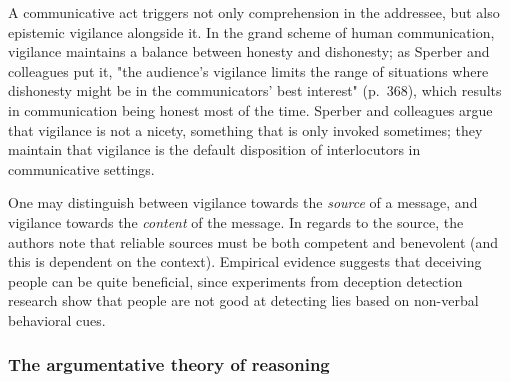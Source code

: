 A communicative act triggers not only comprehension in the addressee, but also epistemic vigilance alongside it.
In the grand scheme of human communication, vigilance maintains a balance between honesty and dishonesty; as Sperber and colleagues put it, "the audience's vigilance limits the range of situations where dishonesty might be in the communicators' best interest" (p.~368), which results in communication being honest most of the time.
Sperber and colleagues argue that vigilance is not a nicety, something that is only invoked sometimes; they maintain that vigilance is the default disposition of interlocutors in communicative settings.

One may distinguish between vigilance towards the \emph{source} of a message, and vigilance towards the \emph{content} of the message.
In regards to the source, the authors note that reliable sources must be both competent and benevolent (and this is dependent on the context).
Empirical evidence suggests that deceiving people can be quite beneficial, since experiments from deception detection research show that people are not good at detecting lies based on non-verbal behavioral cues.

\subsubsection{The argumentative theory of reasoning}

